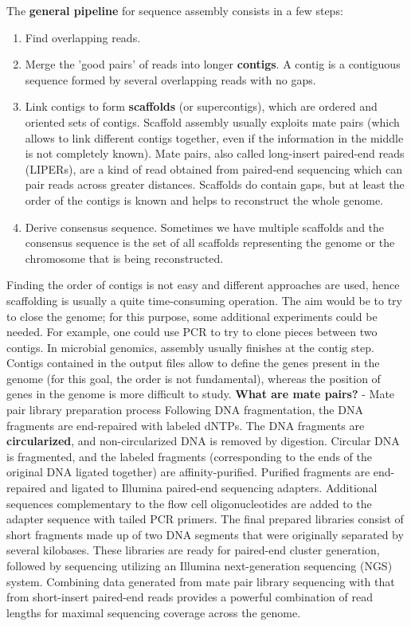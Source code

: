 The \textbf{general pipeline} for sequence assembly consists in a few steps:
\begin{enumerate}
    \item Find overlapping reads.
    \item Merge the 'good pairs' of reads into longer \textbf{contigs}. A contig is a contiguous sequence formed by several overlapping reads with no gaps.
    \item Link contigs to form \textbf{scaffolds} (or supercontigs), which are ordered and oriented sets of contigs. Scaffold assembly usually exploits mate pairs (which allows to link different contigs together, even if the information in the middle is not completely known). Mate pairs, also called long-insert paired-end reads (LIPERs), are a kind of read obtained from paired-end sequencing which can pair reads across greater distances. Scaffolds do contain gaps, but at least the order of the contigs is known and helps to reconstruct the whole genome. 
    \item Derive consensus sequence. Sometimes we have multiple scaffolds and the consensus sequence is the set of all scaffolds representing the genome or the chromosome that is being reconstructed.
\end{enumerate}

Finding the order of contigs is not easy and different approaches are used, hence scaffolding is usually a quite time-consuming operation. The aim would be to try to close the genome; for this purpose, some additional experiments could be needed. For example, one could use PCR to try to clone pieces between two contigs.
In microbial genomics, assembly usually finishes at the contig step. Contigs contained in the output files allow to define the genes present in the genome (for this goal, the order is not fundamental), whereas the position of genes in the genome is more difficult to study.
\textbf{What are mate pairs?} - Mate pair library preparation process
Following DNA fragmentation, the DNA fragments are end-repaired with labeled dNTPs. The DNA fragments are \textbf{circularized}, and non-circularized DNA is removed by digestion. Circular DNA is fragmented, and the labeled fragments (corresponding to the ends of the original DNA ligated together) are affinity-purified. Purified fragments are end-repaired and ligated to Illumina paired-end sequencing adapters.
Additional sequences complementary to the flow cell oligonucleotides are added to the adapter sequence with tailed PCR primers. The final prepared libraries consist of short fragments made up of two DNA segments that were originally separated by several kilobases. These libraries are ready for paired-end cluster generation, followed by sequencing utilizing an Illumina next-generation sequencing (NGS) system.
Combining data generated from mate pair library sequencing with that from short-insert paired-end reads provides a powerful combination of read lengths for maximal sequencing coverage across the genome.

